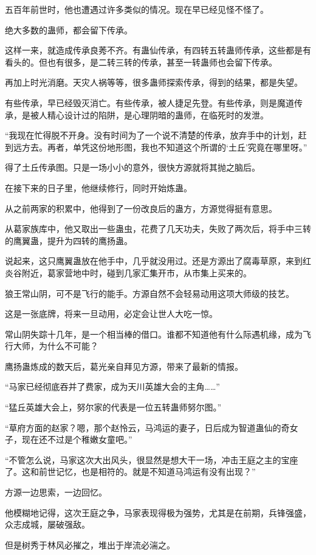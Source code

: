 \begin{this_body}
五百年前世时，他也遭遇过许多类似的情况。现在早已经见怪不怪了。

绝大多数的蛊师，都会留下传承。

这样一来，就造成传承良莠不齐。有蛊仙传承，有四转五转蛊师传承，这些都是有看头的。但也有很多，是二转三转的传承，甚至一转蛊师也会留下传承。

再加上时光消磨。天灾人祸等等，很多蛊师探索传承，得到的结果，都是失望。

有些传承，早已经毁灭消亡。有些传承，被人捷足先登。有些传承，则是魔道传承，是被人精心设计过的陷阱，是心理阴暗的蛊师，在临死时的发泄。

“我现在忙得脱不开身。没有时间为了一个说不清楚的传承，放弃手中的计划，赶到远方去。再者，单凭这份地形图，我也不知道这个所谓的‘土丘’究竟在哪里呀。”

得了土丘传承图。只是一场小小的意外，很快方源就将其抛之脑后。

在接下来的日子里，他继续修行，同时开始炼蛊。

从之前两家的积累中，他得到了一份改良后的蛊方，方源觉得挺有意思。

从葛家族库中，他又取出一些蛊虫，花费了几天功夫，失败了两次后，将手中三转的鹰翼蛊，提升为四转的鹰扬蛊。

说起来，这只鹰翼蛊放在他手中，几乎就没用过。还是方源出了腐毒草原，来到红炎谷附近，葛家营地中时，碰到几家汇集开市，从市集上买来的。

狼王常山阴，可不是飞行的能手。方源自然不会轻易动用这项大师级的技艺。

这是一张底牌，将来一旦动用，必定会让世人大吃一惊。

常山阴失踪十几年，是一个相当棒的借口。谁都不知道他有什么际遇机缘，成为飞行大师，为什么不可能？

鹰扬蛊炼成的数天后，葛光亲自拜见方源，带来了最新的情报。

“马家已经彻底吞并了费家，成为天川英雄大会的主角……”

“猛丘英雄大会上，努尔家的代表是一位五转蛊师努尔图。”

“草府方面的赵家？嗯，那个赵怜云，马鸿运的妻子，日后成为智道蛊仙的奇女子，现在还不过是个稚嫩女童吧。”

“不管怎么说，马家这次大出风头，很显然是想大干一场，冲击王庭之主的宝座了。这和前世记忆，也是相符的。就是不知道马鸿运有没有出现？”

方源一边思索，一边回忆。

他模糊地记得，这次王庭之争，马家表现得极为强势，尤其是在前期，兵锋强盛，众志成城，屡破强敌。

但是树秀于林风必摧之，堆出于岸流必湍之。


\end{this_body}
